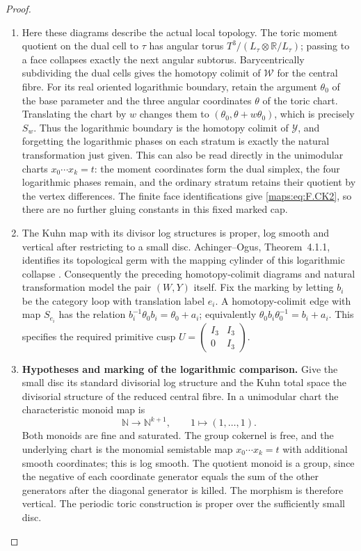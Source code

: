 \documentclass[11pt,a4paper]{article}
\theoremstyle{definition}
\begin{document}
\begin{proof}
\begin{enumerate}[label=\arabic*.]
\item Here these diagrams describe the actual local topology.
The toric moment quotient on the dual cell to $\tau$ has
angular torus $T^3/(L_\tau\otimes\mathbb R/L_\tau)$;
passing to a face collapses exactly the next angular
subtorus.  Barycentrically subdividing the dual cells gives
the homotopy colimit of $\mathcal W$ for the central fibre.
For its real oriented logarithmic boundary, retain the
argument $\theta_0$ of the base parameter and the three
angular coordinates $\theta$ of the toric chart.  Translating
the chart by $w$ changes them to
$(\theta_0,\theta+w\theta_0)$, which is precisely $S_w$.
Thus the logarithmic boundary is the homotopy colimit of
$\mathcal Y$, and forgetting the logarithmic phases on each
stratum is exactly the natural transformation just given.
This can also be read directly in the unimodular charts
$x_0\cdots x_k=t$: the moment coordinates form the dual
simplex, the four logarithmic phases remain, and the ordinary
stratum retains their quotient by the vertex differences.
The finite face identifications give \eqref{maps:eq:F.CK2}, so there are
no further gluing constants in this fixed marked cap.

\item The Kuhn map with its divisor log structures is proper,
log smooth and vertical after restricting to a small disc.
Achinger--Ogus, Theorem~4.1.1, identifies its topological germ
with the mapping cylinder of this logarithmic collapse
\cite[Theorem 4.1.1 and Lemmas 4.1.2--4.1.3, pp.~480--482]{ffAchingerOgus20}.  Consequently the preceding
homotopy-colimit diagrams and natural transformation model
the pair $(W,Y)$ itself.  Fix the marking by letting $b_i$
be the category loop with translation label $e_i$.  A
homotopy-colimit edge with map $S_{e_i}$ has the relation
$b_i^{-1}\theta_0b_i=\theta_0+a_i$; equivalently
$\theta_0b_i\theta_0^{-1}=b_i+a_i$.  This specifies the
required primitive cusp
$U=\begin{pmatrix}I_3&I_3\\0&I_3\end{pmatrix}$.

\item \par\medskip\noindent\textbf{Hypotheses and marking of the logarithmic comparison.}\quad 
\label{maps:mapsF:repair:log-cylinder-scope}
Give the small disc its standard divisorial log structure and
the Kuhn total space the divisorial structure of the reduced
central fibre.  In a unimodular chart the characteristic
monoid map is
\[
 \mathbb N\longrightarrow\mathbb N^{k+1},\qquad
 1\longmapsto(1,\ldots,1).
\]
Both monoids are fine and saturated.  The group cokernel is
free, and the underlying chart is the monomial semistable
map $x_0\cdots x_k=t$ with additional smooth coordinates;
this is log smooth.  The quotient monoid is a group, since
the negative of each coordinate generator equals the sum of
the other generators after the diagonal generator is killed.
The morphism is therefore vertical.  The periodic toric
construction is proper over the sufficiently small disc.


\end{enumerate}
\end{proof}
\end{document}
